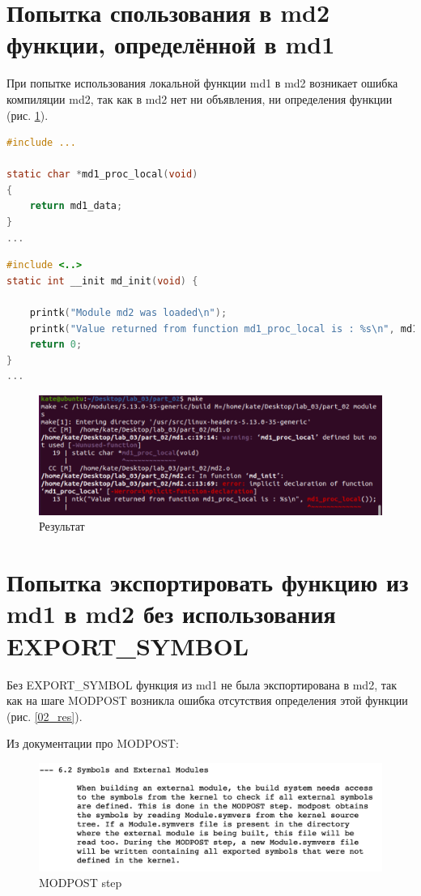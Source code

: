 \documentclass[12pt]{report}
\begin{document}
\section*{Попытка спользования в md2 функции, определённой в md1}
При попытке использования локальной функции md1 в md2 возникает ошибка компиляции md2, так как в md2 нет ни объявления, ни определения функции (рис. \ref{03_res}).
\begin{lstlisting}[label=01_md1,caption=md1.c,language=C]
#include ...

static char *md1_proc_local(void)
{
	return md1_data;
}
...
\end{lstlisting}

\begin{lstlisting}[label=01_md2,caption=md2.c,language=C]
#include <..>
static int __init md_init(void) {
    
    printk("Module md2 was loaded\n");
    printk("Value returned from function md1_proc_local is : %s\n", md1_proc_local());
    return 0;
}
...
\end{lstlisting}

\begin{figure}[H]
	\centering
	\includegraphics[scale = 0.6]{comp.png}
	\caption{Результат}
	\label{03_res}
\end{figure}
\newpage
\section*{Попытка экспортировать функцию из md1 в md2 без использования EXPORT\_SYMBOL}
Без EXPORT\_SYMBOL функция из md1 не была экспортирована в md2, так как на шаге MODPOST возникла ошибка отсутствия определения этой функции (рис. \ref{02_res}). 

Из документации про MODPOST:
\begin{figure}[H]
	\includegraphics[scale = 0.8]{modpost.png}
	\caption{MODPOST step}
	\label{modpost_step}
\end{figure}
\end{document}

